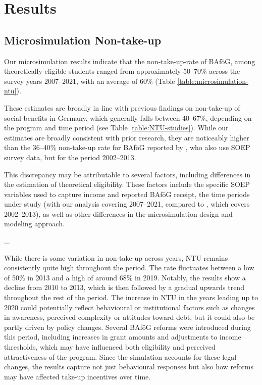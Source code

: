 %
%



\section{Results}
\subsection{Microsimulation Non-take-up}
Our microsimulation results indicate that the non-take-up-rate of BAföG, among theoretically eligible students ranged from approximately 50--70\% across the survey years 2007--2021, with an average of 60\%  (Table \ref{table:microsimulation-ntu}). 

These estimates are broadly in line with previous findings on non-take-up of social benefits in Germany, which generally falls between 40--67\%, depending on the program and time period (see Table \ref{table:NTU-studies}). 
While our estimates are broadly consistent with prior research, they are noticeably higher than the 36--40\% non-take-up rate for BAföG reported by \cite{herber_non-take-up_2019}, who also use SOEP survey data, but for the period 2002--2013.




This discrepancy may be attributable to several factors, including differences in the estimation of theoretical eligibility. These factors include the specific SOEP variables used to capture income and reported BAföG receipt, the time periods under study (with our analysis covering 2007--2021, compared to \cite{herber_non-take-up_2019}, which covers 2002--2013), as well as other differences in the microsimulation design and modeling approach.

...

While there is some variation in non-take-up across years, NTU remains consistently quite high throughout the period. The rate fluctuates between a low of 50\% in 2013 and a high of around 68\% in 2019. Notably, the results show a decline from 2010 to 2013, which is then followed by a gradual upwards trend throughout the rest of the period. The increase in NTU in the years leading up to 2020 could potentially reflect behavioural or institutional factors such as changes in awareness, perceived complexity or attitudes toward debt, but it could also be partly driven by policy changes. Several BAföG reforms were introduced during this period, including increases in grant amounts and adjustments to income thresholds, which may have influenced both eligibility and perceived attractiveness of the program. Since the simulation accounts for these legal changes, the results capture not just behavioural responses but also how reforms may have affected take-up incentives over time.

